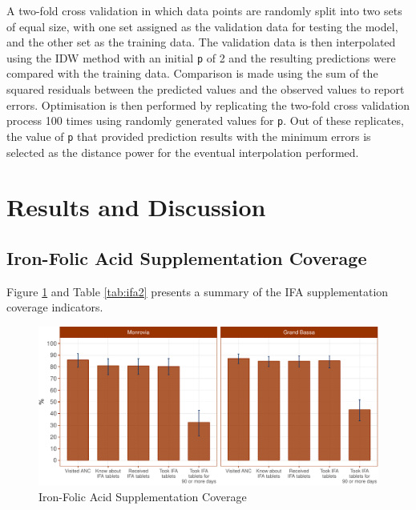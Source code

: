 \documentclass[12pt,a4paper]{article}
\theoremstyle{definition}
\theoremstyle{definition}
\theoremstyle{definition}
\theoremstyle{remark}
\begin{document}
A two-fold cross validation \citep{bivand2008applied} in which data
points are randomly split into two sets of equal size, with one set
assigned as the validation data for testing the model, and the other set
as the training data. The validation data is then interpolated using the
IDW method with an initial \texttt{p} of 2 and the resulting predictions
were compared with the training data. Comparison is made using the sum
of the squared residuals between the predicted values and the observed
values to report errors. Optimisation is then performed by replicating
the two-fold cross validation process 100 times using randomly generated
values for \texttt{p}. Out of these replicates, the value of \texttt{p}
that provided prediction results with the minimum errors is selected as
the distance power for the eventual interpolation performed.

\hypertarget{results-and-discussion}{%
\section{Results and Discussion}\label{results-and-discussion}}

\hypertarget{iron-folic-acid-supplementation-coverage}{%
\subsection{Iron-Folic Acid Supplementation
Coverage}\label{iron-folic-acid-supplementation-coverage}}

Figure \ref{fig:ifa1} and Table \ref{tab:ifa2} presents a summary of the
IFA supplementation coverage indicators.

\begin{figure}[H]

{\centering \includegraphics{liberiaCoverageReport_files/figure-latex/ifa1-1} 

}

\caption{Iron-Folic Acid Supplementation Coverage}\label{fig:ifa1}
\end{figure}
\end{document}
